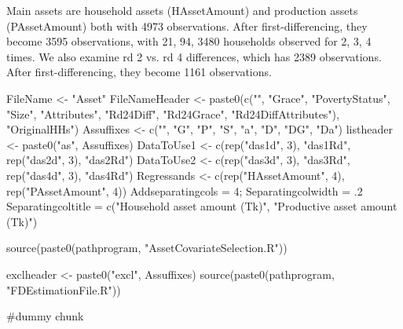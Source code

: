 Main assets are household assets (\textsf{HAssetAmount}) and production assets (\textsf{PAssetAmount}) both with 4973 observations. After first-differencing, they become 3595 observations, with 21, 94, 3480 households observed for 2, 3, 4 times. We also examine rd 2 vs. rd 4 differences, which has 2389 observations. After first-differencing, they become 1161 observations.


\begin{Schunk}
\begin{Sinput}
FileName <- "Asset"
FileNameHeader <- paste0(c("", "Grace", "PovertyStatus", "Size", "Attributes",
  "Rd24Diff", "Rd24Grace", "Rd24DiffAttributes"), "OriginalHHs")
Assuffixes <- c("", "G", "P", "S", "a", "D", "DG", "Da")
listheader <- paste0("as", Assuffixes)
DataToUse1 <- c(rep("das1d", 3), "das1Rd", rep("das2d", 3), "das2Rd")
DataToUse2 <- c(rep("das3d", 3), "das3Rd", rep("das4d", 3), "das4Rd")
Regressands <- c(rep("HAssetAmount", 4), rep("PAssetAmount", 4))
Addseparatingcols = 4; Separatingcolwidth = .2
Separatingcoltitle = c("Household asset amount (Tk)", "Productive asset amount (Tk)")
\end{Sinput}
\end{Schunk}
\begin{Schunk}
\begin{Sinput}
source(paste0(pathprogram, "AssetCovariateSelection.R"))
\end{Sinput}
\end{Schunk}
\begin{Schunk}
\begin{Sinput}
exclheader <- paste0("excl", Assuffixes)
source(paste0(pathprogram, "FDEstimationFile.R"))
\end{Sinput}
\end{Schunk}
\begin{Schunk}
\begin{Sinput}
#dummy chunk
\end{Sinput}
\end{Schunk}

